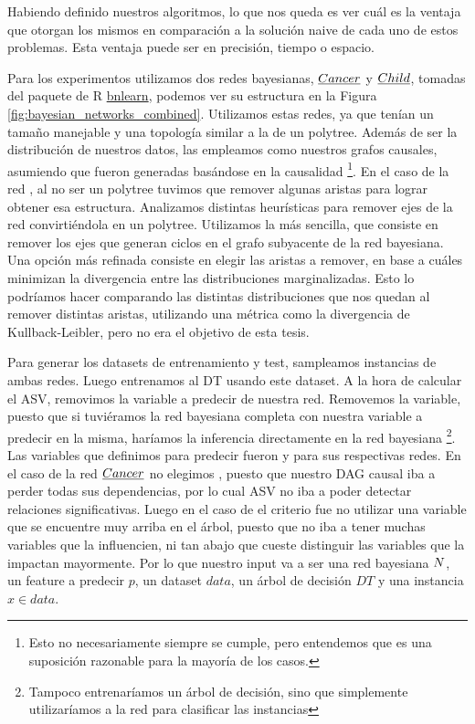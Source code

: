 Habiendo definido nuestros algoritmos, lo que nos queda es ver cuál es la ventaja que otorgan los mismos en comparación a la solución naive de cada uno de estos problemas. Esta ventaja puede ser en precisión, tiempo o espacio. 

Para los experimentos utilizamos dos redes bayesianas, $\emph{Cancer}$ y $\emph{Child}$, tomadas del paquete de R \href{https://www.bnlearn.com/bnrepository/}{bnlearn}, podemos ver su estructura en la Figura \ref{fig:bayesian_networks_combined}. Utilizamos estas redes, ya que tenían un tamaño manejable y una topología similar a la de un polytree. Además de ser la distribución de nuestros datos, las empleamos como nuestros grafos causales, asumiendo que fueron generadas basándose en la causalidad \footnote{Esto no necesariamente siempre se cumple, pero entendemos que es una suposición razonable para la mayoría de los casos.}.
En el caso de la red \childNetwork, al no ser un polytree tuvimos que remover algunas aristas para lograr obtener esa estructura. Analizamos distintas heurísticas para remover ejes de la red convirtiéndola en un polytree. Utilizamos la más sencilla, que consiste en remover los ejes que generan ciclos en el grafo subyacente de la red bayesiana. Una opción más refinada consiste en elegir las aristas a remover, en base a cuáles minimizan la divergencia entre las distribuciones marginalizadas. Esto lo podríamos hacer comparando las distintas distribuciones que nos quedan al remover distintas aristas, utilizando una métrica como la divergencia de Kullback-Leibler, pero no era el objetivo de esta tesis. 

Para generar los datasets de entrenamiento y test, sampleamos instancias de ambas redes. Luego entrenamos al DT usando este dataset. A la hora de calcular el ASV, removimos la variable a predecir de nuestra red. Removemos la variable, puesto que si tuviéramos la red bayesiana completa con nuestra variable a predecir en la misma, haríamos la inferencia directamente en la red bayesiana \footnote{Tampoco entrenaríamos un árbol de decisión, sino que simplemente utilizaríamos a la red para clasificar las instancias}. Las variables que definimos para predecir fueron  y  para sus respectivas redes. En el caso de la red $\emph{Cancer}$ no elegimos , puesto que nuestro DAG causal iba a perder todas sus dependencias, por lo cual ASV no iba a poder detectar relaciones significativas. Luego en el caso de \childNetwork{} el criterio fue no utilizar una variable que se encuentre muy arriba en el árbol, puesto que no iba a tener muchas variables que la influencien, ni tan abajo que cueste distinguir las variables que la impactan mayormente. Por lo que nuestro input va a ser una red bayesiana $N$, un feature a predecir $p$, un dataset $data$, un árbol de decisión $DT$ y una instancia $x \in data$. 

